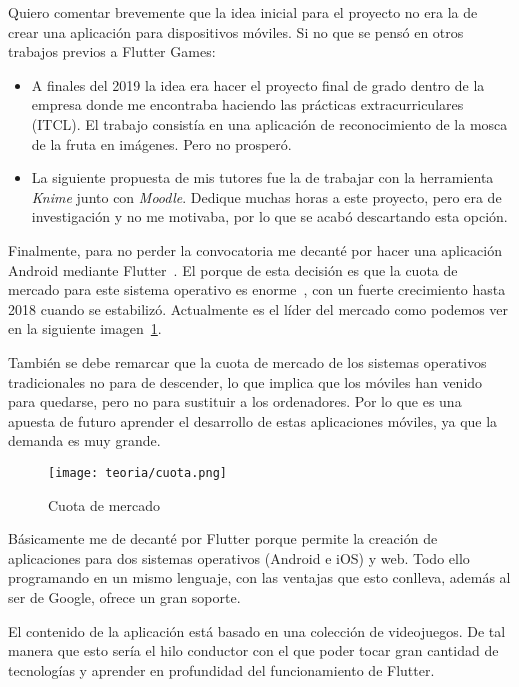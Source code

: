 
Quiero comentar brevemente que la idea inicial para el proyecto no era la de crear una aplicación para dispositivos móviles. Si no que se pensó en otros trabajos previos a Flutter Games:

\begin{itemize}
	\item A finales del 2019 la idea era hacer el proyecto final de grado dentro de la empresa donde me encontraba haciendo las prácticas extracurriculares (ITCL). El trabajo consistía en una aplicación de reconocimiento de la mosca de la fruta en imágenes. Pero no prosperó.
	
	\item La siguiente propuesta de mis tutores fue la de trabajar con la herramienta \emph{Knime} junto con \emph{Moodle}. Dedique muchas horas a este proyecto, pero era de investigación y no me motivaba, por lo que se acabó descartando esta opción.
\end{itemize}

Finalmente, para no perder la convocatoria me decanté por hacer una aplicación Android mediante Flutter~\cite{wiki:flutter}. El porque de esta decisión es que la cuota de mercado para este sistema operativo es enorme~\cite{wiki:marketOS}, con un fuerte crecimiento hasta 2018 cuando se estabilizó. Actualmente es el líder del mercado como podemos ver en la siguiente imagen~\ref{fig:cuota}. 

También se debe remarcar que la cuota de mercado de los sistemas operativos tradicionales no para de descender, lo que implica que los móviles han venido para quedarse, pero no para sustituir a los ordenadores. Por lo que es una apuesta de futuro aprender el desarrollo de estas aplicaciones móviles, ya que la demanda es muy grande.

\begin{figure}[H]
	\centering
	\texttt{[image: teoria/cuota.png]}
	\caption{Cuota de mercado}\label{fig:cuota}
\end{figure}

Básicamente me de decanté por Flutter porque permite la creación de aplicaciones para dos sistemas operativos (Android e iOS) y web. Todo ello programando en un mismo lenguaje, con las ventajas que esto conlleva, además al ser de Google, ofrece un gran soporte.

El contenido de la aplicación está basado en una colección de  videojuegos. De tal manera que esto sería el hilo conductor con el que poder tocar gran cantidad de tecnologías y aprender en profundidad del funcionamiento de Flutter.

